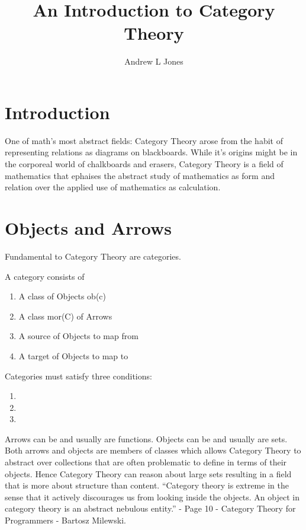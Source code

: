 \documentclass{article}
\title{An Introduction to Category Theory}
\author{Andrew L Jones}\date{}
\begin{document}
\maketitle



\section*{Introduction}
One of math's most abstract fields: Category Theory arose from the habit of representing relations as diagrams on blackboards. While it's origins might be in the corporeal world of chalkboards and erasers, Category Theory is a field of mathematics that ephaises the abstract study of mathematics as form and relation over the applied use of mathematics as calculation.


\section{Objects and Arrows}
Fundamental to Category Theory are categories.
\begin{definition}
A category consists of
\begin{enumerate}
  \item A class of Objects ob(c)
  \item A class mor(C) of Arrows
  \item A source of Objects to map from
  \item A target of Objects to map to
  \end{enumerate}
  Categories must satisfy three conditions:
  \begin{enumerate}
    \item
    \item
    \item
  \end{enumerate}
\end{definition}
Arrows can be and usually are functions. Objects can be and usually are sets. Both arrows and objects are members of classes which allows Category Theory to abstract over collections that are often problematic to define in terms of their objects. Hence Category Theory can reason about large sets resulting in a field that is more about structure than content. “Category theory is extreme in the sense that it actively discourages us from looking inside the objects. An object in category theory is an abstract nebulous entity.” - Page 10 - Category Theory for Programmers - Bartosz Milewski.
\end{document}
